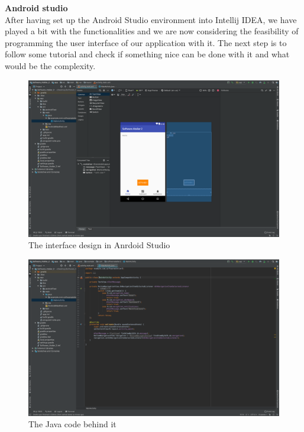 \documentclass[12pt]{scrartcl}
\begin{document}
	\textbf{Android studio}\\

	After having set up the Android Studio environment into Intellij IDEA, we have played a bit with the functionalities and we are now considering the feasibility of programming the user interface of our application with it. The next step is to follow some tutorial and check if something nice can be done with it and what would be the complexity.\\

	\begin{figure}[H]
        		\centering
       		\includegraphics[width=\textwidth]{../images/androidStudio1.png}
       		\caption{The interface design in Anrdoid Studio}
        		\label{androirdStudio1}
	\end{figure}
	
	\begin{figure}[H]
        		\centering
       		\includegraphics[width=\textwidth]{../images/androidStudio2.png}
       		\caption{The Java code behind it}
        		\label{androirdStudio2}
	\end{figure}
	
\end{document}
